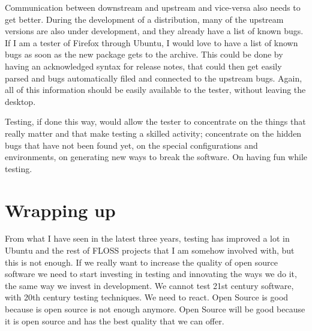 Communication between downstream and upstream and vice-versa also needs to get better. During the development of a distribution, many of the upstream versions are also under development, and they already have a list of known bugs. If I am a tester of Firefox through Ubuntu, I would love to have a list of known bugs as soon as the new package gets to the archive. This could be done by having an acknowledged syntax for release notes, that could then get easily parsed and bugs automatically filed and connected to the upstream bugs. Again, all of this information should be easily available to the tester, without leaving the desktop.

Testing, if done this way, would allow the tester to concentrate on the things that really matter and that make testing a skilled activity; concentrate on the hidden bugs that have not been found yet, on the special configurations and environments, on generating new ways to break the software. On having fun while testing.

\section*{Wrapping up}

From what I have seen in the latest three years, testing has improved a lot in Ubuntu and the rest of FLOSS projects that I am somehow involved with, but this is not enough. If we really want to increase the quality of open source software we need to start investing in testing and innovating the ways we do it, the same way we invest in development. We cannot test 21st century software, with 20th century testing techniques. We need to react. Open Source is good because is open source is not enough anymore. Open Source will be good because it is open source and has the best quality that we can offer.

